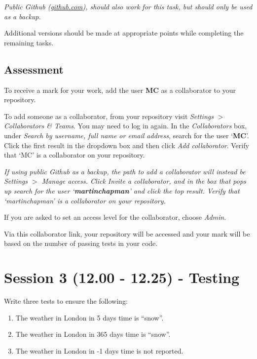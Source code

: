 \documentclass{article}
\begin{document}
\textit{Public Github (\href{https://github.com}{github.com}), should
also work for this task, but should only be used as a backup.}

Additional versions should be made at appropriate points while completing
the remaining tasks.

\subsection{Assessment}

To receive a mark for your work, add the user \textbf{MC} as a
collaborator to your repository.

To add someone as a collaborator, from your repository visit
\textit{Settings} $>$ \textit{Collaborators \& Teams}. You may need to
log in again. In the \textit{Collaborators} box, under \textit{Search
by username, full name or email address}, search for the user
`\textbf{MC}'. Click the first result in the dropdown box and then
click \textit{Add collaborator}. Verify that `MC' is a collaborator on
your repository.

\textit{If using public Github as a backup, the path to add a collaborator
will instead be \textit{Settings} $>$ \textit{Manage access}. Click
\textit{Invite a collaborator}, and in the box that pops up search for
the user `\textbf{martinchapman}' and click the top result. Verify that
`martinchapman' is a collaborator on your repository.}

If you are asked to set an access level for the collaborator, choose
\textit{Admin}.

Via this collaborator link, your repository will be accessed and your
mark will be based on the number of passing tests in your code.

\section{Session 3 (12.00 - 12.25) - Testing}

Write three tests to ensure the following:

\begin{enumerate}

    \item The weather in London in 5 days time is ``snow''.

    \item The weather in London in 365 days time is ``snow''.

    \item The weather in London in -1 days time is not reported.

\end{enumerate}
\end{document}
